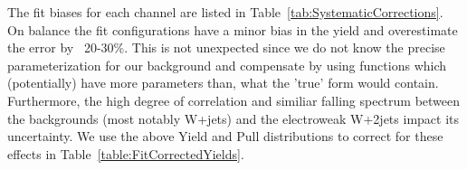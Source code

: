 The fit biases for each channel are listed in Table~\ref{tab:SystematicCorrections}. On balance the fit configurations have a minor bias in the yield and overestimate the error by ~20-30\%. This is not unexpected since we do not know the precise parameterization for our background and compensate by using functions which (potentially) have more parameters than, what the 'true' form would contain. Furthermore, the high degree of correlation and similiar falling spectrum between the backgrounds (most notably W+jets) and the electroweak W+2jets impact its uncertainty. We use the above Yield and Pull distributions to correct for these effects in Table~\ref{table:FitCorrectedYields}.

%
